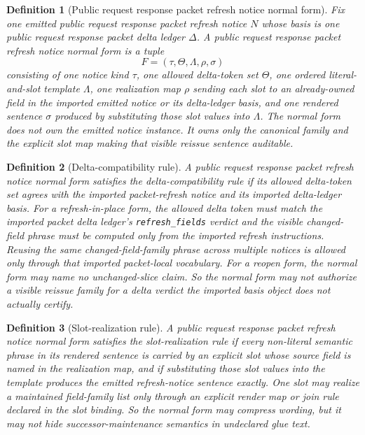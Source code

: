 \documentclass[11pt]{article}
\newtheorem{definition}{Definition}
\begin{document}
\begin{definition}[Public request response packet refresh notice normal form]
Fix one emitted public request response packet refresh notice $N$ whose basis is one public request response packet delta ledger $\Delta$.
A \emph{public request response packet refresh notice normal form} is a tuple
\[
F=(\tau,\Theta,\Lambda,\rho,\sigma)
\]
consisting of one notice kind $\tau$, one allowed delta-token set $\Theta$, one ordered literal-and-slot template $\Lambda$, one realization map $\rho$ sending each slot to an already-owned field in the imported emitted notice or its delta-ledger basis, and one rendered sentence $\sigma$ produced by substituting those slot values into $\Lambda$.
The normal form does not own the emitted notice instance.
It owns only the canonical family and the explicit slot map making that visible reissue sentence auditable.
\end{definition}

\begin{definition}[Delta-compatibility rule]
A public request response packet refresh notice normal form satisfies the \emph{delta-compatibility rule} if its allowed delta-token set agrees with the imported packet-refresh notice and its imported delta-ledger basis.
For a refresh-in-place form, the allowed delta token must match the imported packet delta ledger's \texttt{refresh\_fields} verdict and the visible changed-field phrase must be computed only from the imported refresh instructions. Reusing the same changed-field-family phrase across multiple notices is allowed only through that imported packet-local vocabulary.
For a reopen form, the normal form may name no unchanged-slice claim.
So the normal form may not authorize a visible reissue family for a delta verdict the imported basis object does not actually certify.
\end{definition}

\begin{definition}[Slot-realization rule]
A public request response packet refresh notice normal form satisfies the \emph{slot-realization rule} if every non-literal semantic phrase in its rendered sentence is carried by an explicit slot whose source field is named in the realization map, and if substituting those slot values into the template produces the emitted refresh-notice sentence exactly.
One slot may realize a maintained field-family list only through an explicit render map or join rule declared in the slot binding.
So the normal form may compress wording, but it may not hide successor-maintenance semantics in undeclared glue text.
\end{definition}
\end{document}

